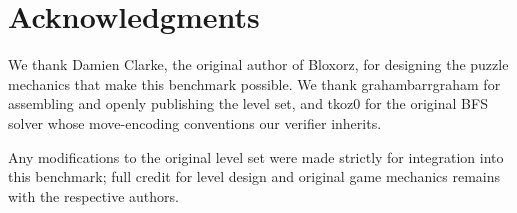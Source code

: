\section*{Acknowledgments}
\label{sec:acks}

We thank Damien Clarke, the original author of Bloxorz, for designing the puzzle
mechanics that make this benchmark possible. We thank grahambarrgraham
\cite{grahambarrgrahambloxorz} for assembling and openly publishing the level set, and
tkoz0 \cite{tkoz0bloxorzsolver} for the original BFS solver whose move-encoding
conventions our verifier inherits.

Any modifications to the original level set were made strictly for integration into
this benchmark; full credit for level design and original game mechanics remains with
the respective authors.
